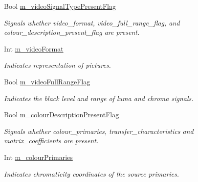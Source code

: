 \begin{DoxyCompactItemize}
Bool \hyperlink{class_t_app_enc_cfg_ac728d6fa6fd161b90814defce0585681}{m\+\_\+video\+Signal\+Type\+Present\+Flag}
\begin{DoxyCompactList}\small\item\em Signals whether video\+\_\+format, video\+\_\+full\+\_\+range\+\_\+flag, and colour\+\_\+description\+\_\+present\+\_\+flag are present. \end{DoxyCompactList}\item 
\mbox{\label{class_t_app_enc_cfg_aa33ba62c4208732f96f121e04e52d239}} 
Int \hyperlink{class_t_app_enc_cfg_aa33ba62c4208732f96f121e04e52d239}{m\+\_\+video\+Format}
\begin{DoxyCompactList}\small\item\em Indicates representation of pictures. \end{DoxyCompactList}\item 
\mbox{\label{class_t_app_enc_cfg_a9de6e7a06763f448281ea74c116fd889}} 
Bool \hyperlink{class_t_app_enc_cfg_a9de6e7a06763f448281ea74c116fd889}{m\+\_\+video\+Full\+Range\+Flag}
\begin{DoxyCompactList}\small\item\em Indicates the black level and range of luma and chroma signals. \end{DoxyCompactList}\item 
\mbox{\label{class_t_app_enc_cfg_a0eb49388c5029f76c1d02a8824c73a97}} 
Bool \hyperlink{class_t_app_enc_cfg_a0eb49388c5029f76c1d02a8824c73a97}{m\+\_\+colour\+Description\+Present\+Flag}
\begin{DoxyCompactList}\small\item\em Signals whether colour\+\_\+primaries, transfer\+\_\+characteristics and matrix\+\_\+coefficients are present. \end{DoxyCompactList}\item 
\mbox{\label{class_t_app_enc_cfg_a90b330a5f8a23ea69ec90839e3b4557b}} 
Int \hyperlink{class_t_app_enc_cfg_a90b330a5f8a23ea69ec90839e3b4557b}{m\+\_\+colour\+Primaries}
\begin{DoxyCompactList}\small\item\em Indicates chromaticity coordinates of the source primaries. \end{DoxyCompactList}\item 

\end{DoxyCompactItemize}

